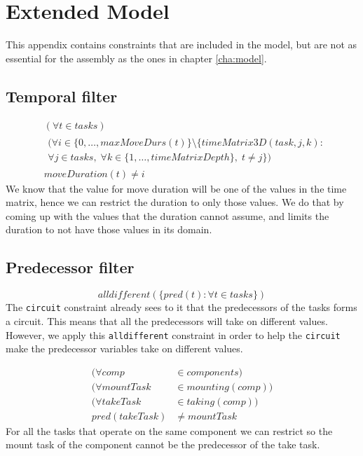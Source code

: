  \chapter{Extended Model}\label{app:ext_mod}
This appendix contains constraints that are included in the model, but are not as essential for the assembly as the ones in chapter \ref{cha:model}.

\section{Temporal filter}
  \begin{equation}
  \begin{aligned}\label{eq:67}
  &(\forall t \in tasks)\\
  &\begin{aligned}
  (\forall i \in \{0 , \ldots , maxMoveDurs(t)\} \setminus \{timeMatrix3D(task,j,k) :\\
  \forall j \in tasks, \; \forall k \in \{1 , \ldots , timeMatrixDepth\}, \; t \neq j\})
  \end{aligned}\\
  &moveDuration(t) \neq i
  \end{aligned}
  \end{equation}
 We know that the value for move duration will be one of the values in the time matrix, hence we can restrict the duration to only those values. We do that by coming up with the values that the duration cannot assume, and limits the duration to not have those values in its domain.

\section{Predecessor filter}
\begin{equation}\label{eq:74}
  alldifferent(\{pred(t) : \forall t \in tasks\})
  \end{equation}
 The \texttt{circuit} constraint already sees to it that the predecessors of the tasks forms a circuit. This means that all the predecessors will take on different values. However, we apply this \texttt{alldifferent} constraint in order to help the \texttt{circuit} make the predecessor variables take on different values.

 \begin{equation}
  \begin{aligned}\label{eq:85}
  (\forall comp &\in components) \\
  (\forall mountTask &\in mounting(comp)) \\
  (\forall takeTask &\in taking(comp)) \\
  pred(takeTask) &\neq mountTask
  \end{aligned}
  \end{equation}
  For all the tasks that operate on the same component we can restrict so the mount task of the component cannot be the predecessor of the take task. 
  
